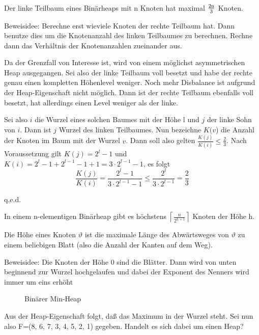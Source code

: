 \begin{satz}
Der linke Teilbaum eines Binärheaps mit n Knoten hat maximal $\frac{2\textup{n}}{3}$ Knoten.
\end{satz}

Beweisidee: Berechne erst wieviele Knoten der rechte Teilbaum hat. Dann benutze dies um die Knotenanzahl des linken Teilbaumes zu
berechnen. Rechne dann das Verhältnis der Knotenanzahlen zueinander aus.
\begin{beweis}
Da der Grenzfall von Interesse ist, wird von einem möglichst asymmetrischen Heap ausgegangen. Sei also der linke Teilbaum voll besetzt
und habe der rechte genau einen kompletten Höhenlevel weniger. Noch mehr Disbalance ist aufgrund der Heap-Eigenschaft nicht möglich.
Dann ist der rechte Teilbaum ebenfalls voll besetzt, hat allerdings einen Level weniger als der linke.

Sei also $i$ die Wurzel eines solchen Baumes mit der Höhe l und $j$ der linke Sohn von $i$. Dann ist $j$ Wurzel des linken Teilbaumes. 
Nun bezeichne $K(v$) die Anzahl der Knoten im Baum mit der Wurzel $v$. Dann soll also gelten 
\(\frac{K(j)}{K(i)} \leq \frac{2}{3}\).
Nach Voraussetzung gilt $K(j)=2^l-1$ und $K(i)=2^l-1+2^{l-1}-1+1=3 \cdot 2^{l-1}-1$, es folgt
\[\frac{K(j)}{K(i)}= \frac{2^l-1}{3\cdot 2^{l-1}-1} \leq \frac{2^l}{3 \cdot 2^{l-1}}= \frac{2}{3}\]

\hfill q.e.d.
\end{beweis}

\begin{satz}
In einem n-elementigen Binärheap gibt es höchstens $\left\lceil \frac{n}{2^{h+1}}\right\rceil$ Knoten der Höhe h.
\end{satz}

\begin{definition}
Die Höhe eines Knoten $\vartheta$ ist die maximale Länge des Abwärtsweges von $\vartheta$ zu einem beliebigen Blatt (also die Anzahl
der Kanten auf dem Weg).
\end{definition}

Beweisidee:
Die Knoten der Höhe 0 sind die Blätter. Dann wird von unten beginnend zur Wurzel hochgelaufen und dabei der
Exponent des Nenners wird immer um eins erhöht
\begin{figure}[H]
	\centering
	\caption{Binärer Min-Heap}
	\label{101103b}
\end{figure}

Aus der Heap-Eigenschaft folgt, daß das Maximum in der Wurzel steht. Sei nun also F=(8, 6, 7, 3, 4, 5, 2, 1) gegeben. Handelt es sich
dabei um einen Heap?

